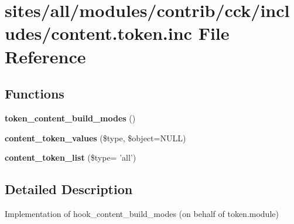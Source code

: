 \hypertarget{content_8token_8inc}{
\section{sites/all/modules/contrib/cck/includes/content.token.inc File Reference}
\label{content_8token_8inc}
}
\subsection*{Functions}
\begin{CompactItemize}
\item 
\hypertarget{content_8token_8inc_d05f6ebd1598c9c483415f34f1e11bb7}{
\textbf{token\_\-content\_\-build\_\-modes} ()}
\label{content_8token_8inc_d05f6ebd1598c9c483415f34f1e11bb7}

\item 
\hypertarget{content_8token_8inc_920eb7b33b070eca28117cb83ead7055}{
\textbf{content\_\-token\_\-values} (\$type, \$object=NULL)}
\label{content_8token_8inc_920eb7b33b070eca28117cb83ead7055}

\item 
\hypertarget{content_8token_8inc_e13fa6b3c14283ca6229599a75325c68}{
\textbf{content\_\-token\_\-list} (\$type= 'all')}
\label{content_8token_8inc_e13fa6b3c14283ca6229599a75325c68}

\end{CompactItemize}


\subsection{Detailed Description}
Implementation of hook\_\-content\_\-build\_\-modes (on behalf of token.module) 